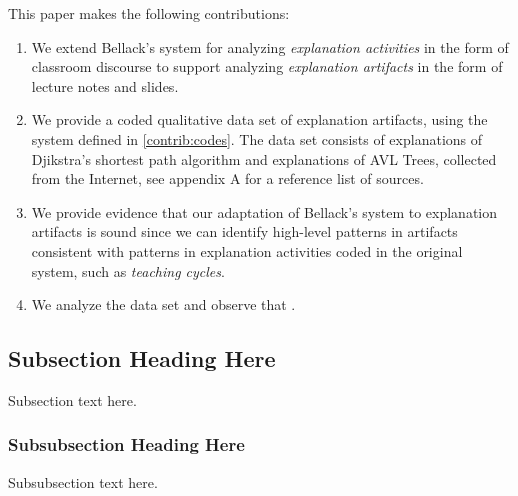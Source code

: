 \documentclass[conference]{IEEEtran}
\begin{document}
This paper makes the following contributions:
%
\begin{enumerate}[C1.]

\item \label{contrib:codes}
%
We extend Bellack's system for analyzing \emph{explanation activities} in the
form of classroom discourse to support analyzing \emph{explanation artifacts}
in the form of lecture notes and slides.

\item \label{contrib:data}
%
We provide a coded qualitative data set of explanation artifacts, using the
system defined in \ref{contrib:codes}. The data set consists of 
explanations of Djikstra's shortest path algorithm and  explanations
of AVL Trees, collected from the Internet, see appendix A for a reference list
of sources.

\item \label{contrib:valid}
%
We provide evidence that our adaptation of Bellack's system to explanation
artifacts is sound since we can identify high-level patterns in artifacts
consistent with patterns in explanation activities coded in the original
system, such as \emph{teaching cycles}.

\item \label{contrib:valid}
%
We analyze the data set and observe that .

\end{enumerate}


\subsection{Subsection Heading Here}
Subsection text here.


\subsubsection{Subsubsection Heading Here}
Subsubsection text here.


%
%
\end{document}
